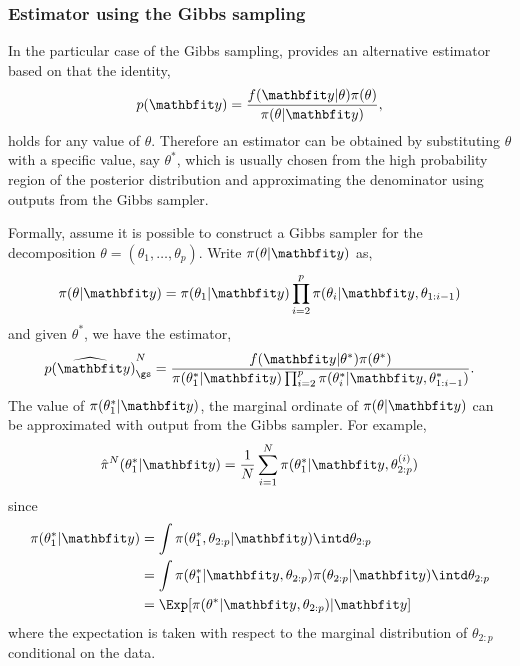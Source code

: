\subsubsection{Estimator using the Gibbs sampling}
\label{ssub:Estimator using the Gibbs sampling}

In the particular case of the Gibbs sampling, \cite{Chib:1995em} provides an
alternative estimator based on that the identity,
\begin{equation}
  p(\data) = \frac{f(\data|\theta)\pi(\theta)}{\pi(\theta|\data)},
\end{equation}
holds for any value of $\theta$. Therefore an estimator can be obtained by
substituting $\theta$ with a specific value, say $\theta^*$, which is usually
chosen from the high probability region of the posterior distribution and
approximating the denominator using outputs from the Gibbs sampler.

Formally, assume it is possible to construct a Gibbs sampler for the
decomposition $\theta = (\theta_1,\dots,\theta_p)$. Write $\pi(\theta|\data)$
as,
\begin{equation}
  \pi(\theta|\data) = \pi(\theta_1|\data)
  \prod_{i=2}^p\pi(\theta_i|\data,\theta_{1:i-1})
\end{equation}
and given $\theta^*$, we have the estimator,
\begin{equation}
  \widehat{p(\data)}_{\gs}^N = \frac{f(\data|\theta^*)\pi(\theta^*)}
  {\pi(\theta_1^*|\data)
    \prod_{i=2}^p\pi(\theta_i^*|\data,\theta_{1:i-1}^*)}.
\end{equation}
The value of $\pi(\theta_1^*|\data)$, the marginal ordinate of
$\pi(\theta|\data)$ can be approximated with output from the Gibbs sampler.
For example,
\begin{equation}
  \hat\pi^N(\theta_1^*|\data)
  = \frac{1}{N}\sum_{i=1}^N \pi(\theta_1^*|\data,\theta_{2:p}^{(i)})
  \label{eq:est gibbs first}
\end{equation}
since
\begin{align*}
  \pi(\theta_1^*|\data)
  &= \int\pi(\theta_1^*, \theta_{2:p}|\data)\intd\theta_{2:p} \\
  &= \int\pi(\theta_1^*|\data,\theta_{2:p})
  \pi(\theta_{2:p}|\data)\intd\theta_{2:p} \\
  &= \Exp[\pi(\theta^*|\data,\theta_{2:p})|\data]
\end{align*}
where the expectation is taken with respect to the marginal distribution of
$\theta_{2:p}$ conditional on the data.

